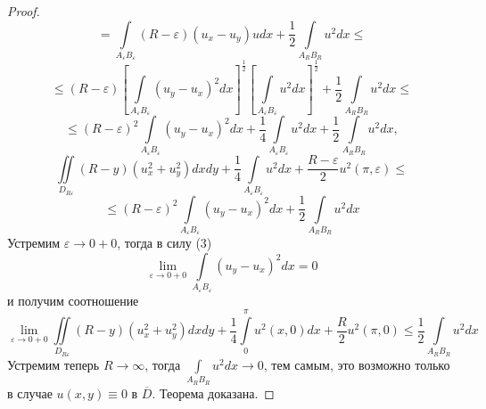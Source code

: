 \documentclass[a4paper, 11pt]{article}
\begin{document}
\begin{proof}
\begin{equation*}
	\end{equation*}
	\begin{equation*}
		= \int\limits_{A_\varepsilon B_\varepsilon} \left(R - \varepsilon \right) \left(u_x - u_y\right)u dx + \dfrac12  \int\limits_{A_R B_R} u^2 dx \leq
	\end{equation*}
	\begin{equation*}
		\leq \left(R - \varepsilon\right) \left[\int\limits_{A_\varepsilon B_\varepsilon} \left( u_y - u_x\right)^2 dx \right]^{\frac12} \left[\int\limits_{A_\varepsilon B_\varepsilon} u^2 dx \right]^{\frac12} + \dfrac12 \int\limits_{A_RB_R} u^2 dx \leq
	\end{equation*}
	\begin{equation*}
		\leq \left(R - \varepsilon\right)^2 \int\limits_{A_\varepsilon B_\varepsilon} \left( u_y - u_x\right)^2 dx + \dfrac14 \int\limits_{A_\varepsilon B_\varepsilon} u^2 dx +\dfrac12 \int\limits_{A_RB_R} u^2 dx, 
	\end{equation*}
	\begin{equation*}
		\iint\limits_{D_{R\varepsilon}} \left(R - y\right) \left(u_x^2 + u_y^2\right) dx dy + \dfrac{1}{4}\int\limits_{A_\varepsilon B_\varepsilon} u^2 dx +\dfrac{R - \varepsilon}{2}u^2(\pi, \varepsilon) \leq 
	\end{equation*}
	\begin{equation*}
		\leq \left(R - \varepsilon\right)^2 \int\limits_{A_\varepsilon B_\varepsilon} \left( u_y - u_x\right)^2 dx  +\dfrac12 \int\limits_{A_RB_R} u^2 dx
	\end{equation*}
	Устремим $\varepsilon \to 0 + 0$, тогда в силу (3)
	\begin{equation*}
		\lim\limits_{\varepsilon \to 0 + 0} \int\limits_{A_\varepsilon B_\varepsilon} \left(u_y - u_x\right)^2 dx = 0
	\end{equation*}
	и получим соотношение
	\begin{equation*}
		\lim\limits_{\varepsilon \to 0 + 0} \iint\limits_{D_{R\varepsilon}} \left(R - y\right) \left(u_x^2 + u_y^2 \right) dx dy + \dfrac14 \int\limits_0^\pi u^2(x,0) dx + \dfrac{R}{2}u^2(\pi,0) \leq \dfrac12 \int\limits_{A_RB_R} u^2 dx
	\end{equation*}
	Устремим теперь $R \to \infty$, тогда $\int\limits_{A_RB_R} u^2 dx \to 0$, тем самым, это возможно только в случае $u(x,y) \equiv 0$ в $\overline{D}$. Теорема доказана. 
\end{proof}
\newpage
{}
\vspace{-2.3cm}
\renewcommand{\refname}{\begin{center}
{\normalsize \rm СПИСОК ЛИТЕРАТУРЫ} \end{center}}
\end{document}
